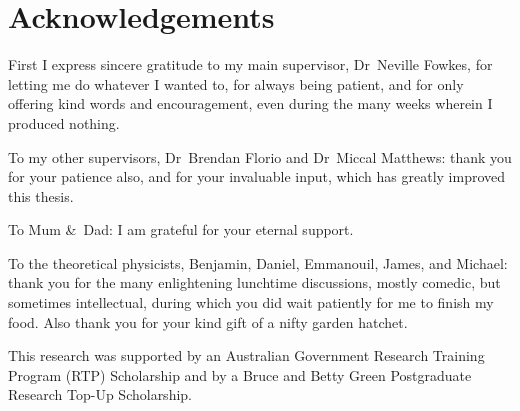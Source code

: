 \chapter{Acknowledgements}
\label{ch:acknowledgements}

\begin{loosecontent}

First I express sincere gratitude to my main supervisor,
Dr~Neville Fowkes,
for letting me do whatever I wanted to,
for always being patient,
and for only offering kind words and encouragement,
even during the many weeks wherein I produced nothing.

To my other supervisors,
Dr~Brendan Florio and Dr~Miccal Matthews:
thank you for your patience also,
and for your invaluable input,
which has greatly improved this thesis.

To Mum \&~Dad:
I am grateful for your eternal support.

To the theoretical physicists,
Benjamin, Daniel, Emmanouil, James, and Michael:
thank you for the many enlightening lunchtime discussions,
mostly comedic, but sometimes intellectual,
during which you did wait patiently for me to finish my food.
Also thank you for your kind gift of a nifty garden hatchet.

\end{loosecontent}

\thematicbreak

This research was supported
by an Australian Government Research Training Program (RTP) Scholarship
and by a Bruce and Betty Green Postgraduate Research Top-Up Scholarship.
